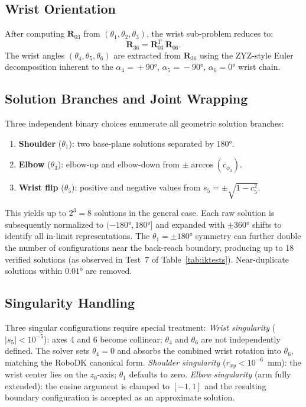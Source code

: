 \documentclass[conference]{IEEEtran}
\begin{document}
\subsection{Wrist Orientation}
After computing $\mathbf{R}_{03}$ from $(\theta_1,\theta_2,\theta_3)$, the wrist sub-problem reduces to:
\begin{equation}
\mathbf{R}_{36} = \mathbf{R}_{03}^T\,\mathbf{R}_{06}.
\end{equation}
The wrist angles $(\theta_4,\theta_5,\theta_6)$ are extracted from $\mathbf{R}_{36}$ using the ZYZ-style Euler decomposition inherent to the $\alpha_4\!=\!+90°$, $\alpha_5\!=\!-90°$, $\alpha_6\!=\!0°$ wrist chain.

\subsection{Solution Branches and Joint Wrapping}
Three independent binary choices enumerate all geometric solution branches:
\begin{enumerate}
\item \textbf{Shoulder} ($\theta_1$): two base-plane solutions separated by $180°$.
\item \textbf{Elbow} ($\theta_3$): elbow-up and elbow-down from $\pm\arccos(c_{\phi_3})$.
\item \textbf{Wrist flip} ($\theta_5$): positive and negative values from $s_5 = \pm\sqrt{1-c_5^2}$.
\end{enumerate}
This yields up to $2^3 = 8$ solutions in the general case.
Each raw solution is subsequently normalized to $(-180°, 180°]$ and expanded with $\pm360°$ shifts to identify all in-limit representations.
The $\theta_1 = \pm 180°$ symmetry can further double the number of configurations near the back-reach boundary, producing up to 18 verified solutions (as observed in Test~7 of Table~\ref{tab:iktests}).
Near-duplicate solutions within $0.01°$ are removed.

\subsection{Singularity Handling}
Three singular configurations require special treatment:
\textit{Wrist singularity} ($|s_5| < 10^{-5}$): axes 4 and 6 become collinear; $\theta_4$ and $\theta_6$ are not independently defined.
The solver sets $\theta_4 = 0$ and absorbs the combined wrist rotation into $\theta_6$, matching the RoboDK canonical form.
\textit{Shoulder singularity} ($r_{xy} < 10^{-6}$~mm): the wrist center lies on the $z_0$-axis; $\theta_1$ defaults to zero.
\textit{Elbow singularity} (arm fully extended): the cosine argument is clamped to $[-1,1]$ and the resulting boundary configuration is accepted as an approximate solution.
\end{document}
